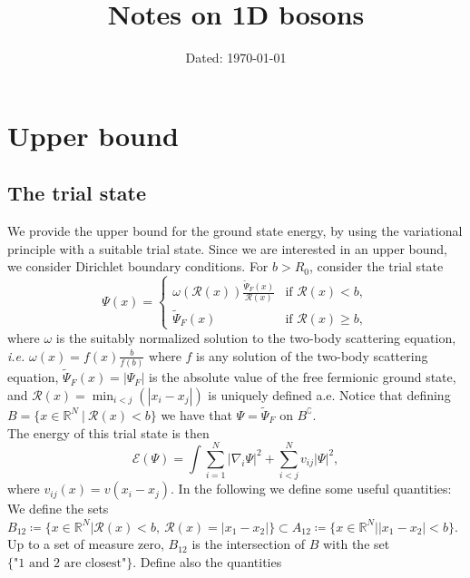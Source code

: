 \documentclass[a4paper,11pt]{article}
\author{}
\date{Dated: \today}
\title{Notes on 1D bosons}
\newcommand{\abs}[1]{\left\lvert #1 \right\rvert}
\newcommand{\ie}{\emph{i.e.} }
\newcommand{\R}{\mathbb{R}}
\newcommand{\rr}{\mathcal{R}}
\numberwithin{equation}{section}
\begin{document}
	\maketitle
	\section{Upper bound}
	
	\subsection{The trial state}
	We provide the upper bound for the ground state energy, by using the variational principle with a suitable trial state. Since we are interested in an upper bound, we consider Dirichlet boundary conditions.
	For $ b>R_0 $, consider the trial state	\begin{equation}
	\Psi(x)=\begin{cases}
	\omega(\rr(x))\frac{\tilde{\Psi}_F(x)}{\rr(x)}& \text{if }\rr(x)<b,\\
	\tilde{\Psi}_F(x)&\text{if }\rr(x)\geq b,
	\end{cases}
	\end{equation}
	where $ \omega $ is the suitably normalized solution to the two-body scattering equation, \ie $ \omega(x)=f(x)\frac{b}{f(b)} $ where $ f $ is any solution of the two-body scattering equation,  $ \tilde{\Psi}_F(x)=\abs{\Psi_F} $ is the absolute value of the free fermionic ground state, and $ \rr(x)=\min_{i<j}(\abs{x_i-x_j}) $ is uniquely defined a.e. Notice that defining $ B=\{x\in\R^N\ \vert\ \mathcal{R}(x)<b \} $ we have that $ \Psi=\tilde{\Psi}_F $ on $ B^\complement $.\\
	The energy of this trial state is then\begin{equation}
	\mathcal{E}(\Psi)=\int \sum_{i=1}^{N}\abs{\nabla_i\Psi}^2+\sum_{i<j}^{N}v_{ij}\abs{\Psi}^2,
	\end{equation}
	where $ v_{ij}(x)=v(x_i-x_j) $. In the following we define some useful quantities:\\
	We define the sets $ B_{12}\coloneqq\{x\in\R^N \vert \rr(x)<b,\ \rr(x)=\abs{x_1-x_2} \}\subset A_{12}\coloneqq\{x\in\R^N\vert \abs{x_1-x_2}<b\} $. Up to a set of measure zero, $ B_{12} $ is the intersection of $ B $ with the set $ \{\text{"1 and 2 are closest"}\} $. Define also the quantities
	
\end{document}
